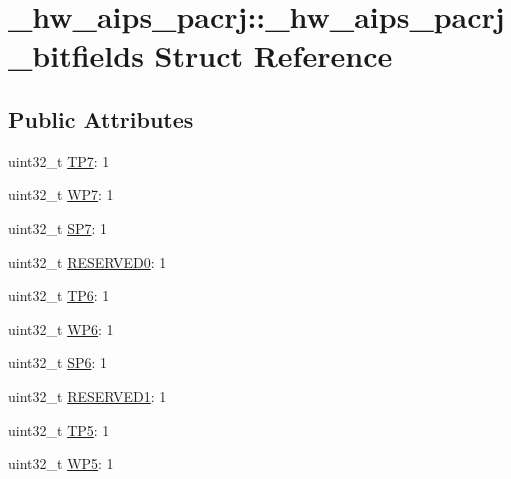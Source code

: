 \hypertarget{struct__hw__aips__pacrj_1_1__hw__aips__pacrj__bitfields}{}\section{\+\_\+hw\+\_\+aips\+\_\+pacrj\+:\+:\+\_\+hw\+\_\+aips\+\_\+pacrj\+\_\+bitfields Struct Reference}
\label{struct__hw__aips__pacrj_1_1__hw__aips__pacrj__bitfields}
\subsection*{Public Attributes}
\begin{DoxyCompactItemize}
\item 
uint32\+\_\+t \hyperlink{struct__hw__aips__pacrj_1_1__hw__aips__pacrj__bitfields_a52f21c7df429089d9c49d8bfb19f82ff}{T\+P7}\+: 1
\item 
uint32\+\_\+t \hyperlink{struct__hw__aips__pacrj_1_1__hw__aips__pacrj__bitfields_a7b97dc427efa7001a90f9422a392eea6}{W\+P7}\+: 1
\item 
uint32\+\_\+t \hyperlink{struct__hw__aips__pacrj_1_1__hw__aips__pacrj__bitfields_a34c50d3e0ca68473cf6066f96185616f}{S\+P7}\+: 1
\item 
uint32\+\_\+t \hyperlink{struct__hw__aips__pacrj_1_1__hw__aips__pacrj__bitfields_a1e35680abe461503ffffa5291c3cfb2d}{R\+E\+S\+E\+R\+V\+E\+D0}\+: 1
\item 
uint32\+\_\+t \hyperlink{struct__hw__aips__pacrj_1_1__hw__aips__pacrj__bitfields_abd0a7469b1a0234cf8827da3f0cc6f4f}{T\+P6}\+: 1
\item 
uint32\+\_\+t \hyperlink{struct__hw__aips__pacrj_1_1__hw__aips__pacrj__bitfields_ac040da5528d1bb44f90858ba07318e92}{W\+P6}\+: 1
\item 
uint32\+\_\+t \hyperlink{struct__hw__aips__pacrj_1_1__hw__aips__pacrj__bitfields_a819a889944069a3d24bb42f1b3b955c5}{S\+P6}\+: 1
\item 
uint32\+\_\+t \hyperlink{struct__hw__aips__pacrj_1_1__hw__aips__pacrj__bitfields_af5e25dfb4c9dc74bbbf30fb66bdd96b0}{R\+E\+S\+E\+R\+V\+E\+D1}\+: 1
\item 
uint32\+\_\+t \hyperlink{struct__hw__aips__pacrj_1_1__hw__aips__pacrj__bitfields_a5f7891f4551bd8feef9dadf014d28fb0}{T\+P5}\+: 1
\item 
uint32\+\_\+t \hyperlink{struct__hw__aips__pacrj_1_1__hw__aips__pacrj__bitfields_a86126fd14b241b44925caa7ef41b45cf}{W\+P5}\+: 1

\end{DoxyCompactItemize}
